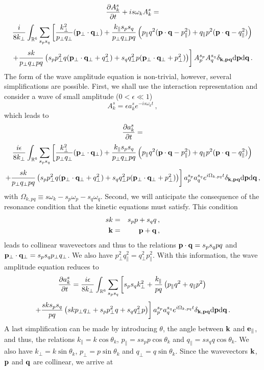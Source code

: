 \documentclass{jpp}
\def\be{\begin{equation}}
\def\ee{\end{equation}}
\def\ba{\begin{eqnarray}}
\def\ea{\end{eqnarray}}
\def\kk{{\bf k}}
\def\pp{{\bf p}}
\def\qq{{\bf q}}
\def\kpa{k_{\parallel}}
\def\ppa{p_{\parallel}}
\def\qpa{q_{\parallel}}
\def\kpe{k_{\perp}}
\def\ppe{p_{\perp}}
\def\qpe{q_{\perp}}
\def\ppeb{{\bf p_{\perp}}}
\def\qpeb{{\bf q_{\perp}}}
\def\dd{\mathrm{d}}
\begin{document}
\be
{\partial A_k^s \over \partial t} + i s \omega_k A_k^s = 
\ee
$$
\frac{i}{8 \kpe} \int_{\mathbb{R}^6} \sum_{s_p s_q} 
\left[ \frac{\kpe^2}{\ppe \qpe} (\ppeb \cdot \qpeb) 
+ \frac{\kpa s_ps_q}{\ppe \qpe pq} \left( \ppa q^2 (\pp \cdot \qq - \ppa^2) + \qpa p^2 (\pp \cdot \qq - \qpa^2) \right) \right.
$$
$$\left. + \frac{sk}{\ppe \qpe pq} \left( s_p \ppe^2q (\ppeb \cdot \qpeb + \qpe^2) + s_q \qpe^2 p (\ppeb \cdot \qpeb + \ppe^2) \right) \right] 
A_p^{s_p} A_q^{s_q} \delta_{\kk,\pp\qq} \dd \pp \dd \qq \, .$$
The form of the wave amplitude equation is non-trivial, however, several simplifications are possible. First, we shall use the interaction representation and consider a wave of small amplitude ($0 < \epsilon \ll 1$)
\be
A_k^s = \epsilon a_k^s e^{-is\omega_kt} \, ,
\ee
which leads to
\be
{\partial a_k^s \over \partial t} =
\ee
$$\frac{i \epsilon}{8 \kpe} \int_{\mathbb{R}^6} \sum_{s_p s_q} \left[ \frac{\kpe^2}{\ppe \qpe} (\ppeb \cdot \qpeb) 
+ \frac{\kpa s_ps_q}{\ppe \qpe pq} \left( \ppa q^2 (\pp \cdot \qq - \ppa^2) + \qpa p^2 (\pp \cdot \qq - \qpa^2) \right) \right.
$$
$$
\left. +\frac{sk}{\ppe \qpe pq} \left( s_p \ppe^2q (\ppeb \cdot \qpeb + \qpe^2) + s_q \qpe^2 p (\ppeb \cdot \qpeb + \ppe^2) \right) \right] 
a_p^{s_p} a_q^{s_q} e^{i\Omega_{k,pq} t} \delta_{\kk,\pp\qq} \dd \pp \dd \qq \, ,
$$
with $\Omega_{k,pq} \equiv s\omega_k - s_p\omega_p - s_q\omega_q$. Second, we will anticipate the consequence of the resonance condition that the kinetic equations must satisfy. This condition 
\ba
sk &=& s_pp + s_qq \, , \\
\kk &=& \pp + \qq \, ,
\ea
leads to collinear wavevectors and thus to the relations $\pp \cdot \qq = s_p s_q pq$ and $\ppeb \cdot \qpeb = s_p s_q \ppe \qpe$. We also have $\ppe^2\qpa^2=\qpe^2 \ppa^2$. With this information, the wave amplitude equation reduces to
\be
{\partial a_k^s \over \partial t} = 
\frac{i \epsilon}{8 \kpe} \int_{\mathbb{R}^6} \sum_{s_p s_q} \left[ s_p s_q \kpe^2 + \frac{\kpa}{pq} \left( \ppa q^2 + \qpa p^2 \right) \right.
\ee
$$\left. + \frac{sks_ps_q}{pq} \left( sk\ppe\qpe + s_p \ppe^2q  + s_q \qpe^2 p \right) \right] 
a_p^{s_p} a_q^{s_q} e^{i\Omega_{k,pq} t} \delta_{\kk,\pp\qq} \dd \pp \dd \qq \, .
$$
A last simplification can be made by introducing $\theta$, the angle between $\kk$ and ${\bf e_\parallel}$, and thus, the relations $\kpa = k \cos \theta_k$, $p_\parallel=s s_p p \cos \theta_k$ and $q_\parallel=s s_q q \cos \theta_k$. We also have $\kpe = k \sin \theta_k$, $p_\perp = p \sin \theta_k$ and $q_\perp = q \sin \theta_k$. Since the wavevectors $\kk$, $\pp$ and $\qq$ are collinear, we arrive at
\end{document}
